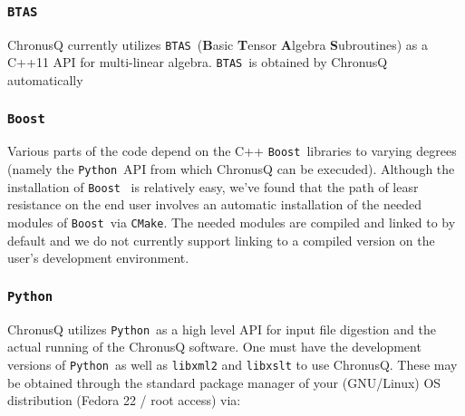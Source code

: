\documentclass[12pt]{article}
\newcommand{\CMake}{\texttt{CMake}}
\newcommand{\BTAS}{\texttt{BTAS}}
\newcommand{\Boost}{\texttt{Boost}}
\newcommand{\Python}{\texttt{Python}}
\begin{document}
      \subsubsection{\BTAS} \label{subsubsec:BTAS}
        ChronusQ currently utilizes \BTAS~(\textbf{B}asic \textbf{T}ensor
        \textbf{A}lgebra \textbf{S}ubroutines) \cite{btas} as a C++11 API for multi-linear 
	algebra. \BTAS~is obtained by ChronusQ automatically

      \subsubsection{\Boost} \label{subsubsec:boost} 
%
%
        Various parts of the code depend on the C++ \Boost~libraries \cite{boost} to
	varying degrees (namely the \Python~API from which ChronusQ can be execuded).
	Although the installation of \Boost~ is relatively easy, we've found that
	the path of leasr resistance on the end user involves an automatic installation
	of the needed modules of \Boost~via \CMake. The needed modules are compiled
	and linked to by default and we do not currently support linking to a compiled
	version on the user's development environment.

      \subsubsection{\Python} \label{subsubsec:Python} 
        ChronusQ utilizes \Python~as a high level API for input
        file digestion and the actual running of the ChronusQ software. One
	must have the development versions of \Python~as well as \texttt{libxml2} 
	and \texttt{libxslt} to use ChronusQ. These may be obtained through the 
	standard package manager of your (GNU/Linux) OS distribution (Fedora 22 /
	root access) via:
\end{document}
